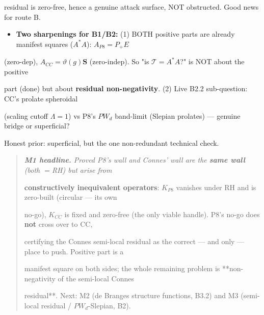\documentclass[10pt]{article}
\begin{document}
  residual is zero-free, hence a genuine attack surface, NOT obstructed. Good news for route B.\par
\begin{itemize}
\item \textbf{Two sharpenings for B1/B2:} (1) BOTH positive parts are already manifest squares ($A^*A$): $A_{P8}=P_+E$
\end{itemize}
  (zero-dep), $A_{CC}=\vartheta(g)\mathbf S$ (zero-indep). So "is $\mathcal T=A^*A$?" is NOT about the positive\par
  part (done) but about \textbf{residual non-negativity}. (2) Live B2.2 sub-question: CC's prolate spheroidal\par
  (scaling cutoff $\Lambda=1$) vs P8's $PW_d$ band-limit (Slepian prolates) --- genuine bridge or superficial?\par
  Honest prior: superficial, but the one non-redundant technical check.\par

\begin{quote}\itshape
\textbf{M1 headline.} Proved P8's wall and Connes' wall are the \textbf{same wall} (both $=$RH) but arise from\par
\textbf{constructively inequivalent operators}: $K_{P8}$ vanishes under RH and is zero-built (circular --- its own\par
no-go), $K_{CC}$ is fixed and zero-free (the only viable handle). P8's no-go does \textbf{not} cross over to CC,\par
certifying the Connes semi-local residual as the correct --- and only --- place to push. Positive part is a\par
manifest square on both sides; the whole remaining problem is **non-negativity of the semi-local Connes\par
residual**. Next: M2 (de Branges structure functions, B3.2) and M3 (semi-local residual / $PW_d$-Slepian, B2).\par
\end{quote}
\end{document}
